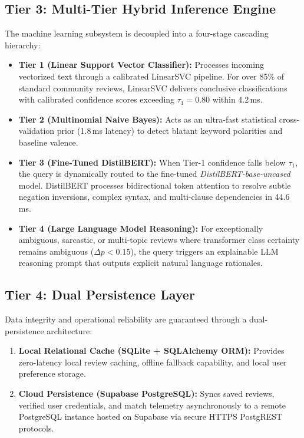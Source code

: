 \subsection{Tier 3: Multi-Tier Hybrid Inference Engine}
The machine learning subsystem is decoupled into a four-stage cascading hierarchy:
\begin{itemize}
    \item \textbf{Tier 1 (Linear Support Vector Classifier):} Processes incoming vectorized text through a calibrated LinearSVC pipeline. For over 85\% of standard community reviews, LinearSVC delivers conclusive classifications with calibrated confidence scores exceeding $\tau_1 = 0.80$ within 4.2\,ms.
    \item \textbf{Tier 2 (Multinomial Naive Bayes):} Acts as an ultra-fast statistical cross-validation prior (1.8\,ms latency) to detect blatant keyword polarities and baseline valence.
    \item \textbf{Tier 3 (Fine-Tuned DistilBERT):} When Tier-1 confidence falls below $\tau_1$, the query is dynamically routed to the fine-tuned \textit{DistilBERT-base-uncased} model. DistilBERT processes bidirectional token attention to resolve subtle negation inversions, complex syntax, and multi-clause dependencies in 44.6\,ms.
    \item \textbf{Tier 4 (Large Language Model Reasoning):} For exceptionally ambiguous, sarcastic, or multi-topic reviews where transformer class certainty remains ambiguous ($\Delta p < 0.15$), the query triggers an explainable LLM reasoning prompt that outputs explicit natural language rationales.
\end{itemize}

\subsection{Tier 4: Dual Persistence Layer}
Data integrity and operational reliability are guaranteed through a dual-persistence architecture:
\begin{enumerate}
    \item \textbf{Local Relational Cache (SQLite + SQLAlchemy ORM):} Provides zero-latency local review caching, offline fallback capability, and local user preference storage.
    \item \textbf{Cloud Persistence (Supabase PostgreSQL):} Syncs saved reviews, verified user credentials, and match telemetry asynchronously to a remote PostgreSQL instance hosted on Supabase via secure HTTPS PostgREST protocols.
\end{enumerate}

